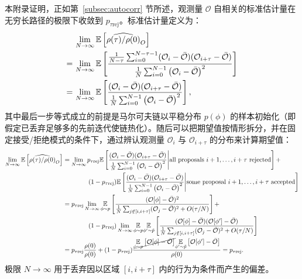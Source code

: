 本附录证明，正如第~\ref{subsec:autocorr} 节所述，观测量 $\mathcal{O}$ 自相关的标准估计量在无穷长路径的极限下收敛到 $p_{\tau \mathrm{rej}}$。标准估计量定义为：
%
\begin{align}
& \lim_{N\rightarrow\infty} \underset{}{\mathbb{E}}\left[ \widehat{\rho(\tau)/\rho(0)}_O \right] \\
=\,&
    \lim_{N\rightarrow\infty} \underset{}{\mathbb{E}} \left[ \frac{\frac{1}{N-\tau} \sum_{i=0}^{N-\tau-1} (\mathcal{O}_i - \bar{\mathcal{O}})(\mathcal{O}_{i+\tau}-\bar{\mathcal{O}})}{\frac{1}{N} \sum_{i=0}^{N-1} \left(\mathcal{O}_i - \bar{\mathcal{O}}\right)^2} \right] \\
=\,& \lim_{N\rightarrow\infty} \underset{}{\mathbb{E}} \left[ \frac{(\mathcal{O}_i - \bar{\mathcal{O}})(\mathcal{O}_{i+\tau}-\bar{\mathcal{O}})}{\frac{1}{N} \sum_{i=0}^{N-1} \left(\mathcal{O}_i - \bar{\mathcal{O}}\right)^2} \right],
\end{align}
%
其中最后一步等式成立的前提是马尔可夫链以平稳分布 $p(\phi)$ 的样本初始化（即假定已丢弃足够多的先前迭代使链热化）。随后可以把期望值按情形拆分，并在固定接受/拒绝模式的条件下，通过辨认观测量 $\mathcal{O}_i$ 与 $\mathcal{O}_{i+\tau}$ 的分布来计算期望值：
%
\begin{align}
\lim_{N\rightarrow\infty} \underset{}{\mathbb{E}}\left[ \widehat{\rho(\tau)/\rho(0)}_O \right]
&= \lim_{N\rightarrow \infty} p_{\tau\text{rej}} \underset{}{\mathbb{E}} \left[ \frac{(\mathcal{O}_i - \bar{\mathcal{O}})(\mathcal{O}_{i+\tau}-\bar{\mathcal{O}})}{\frac{1}{N} \sum_{i=0}^{N-1} \left(\mathcal{O}_i - \bar{\mathcal{O}}\right)^2}
    \Bigg| \text{all proposals } i+1, \dots, i+\tau \text{ rejected} \right] + \nonumber\\
    &\qquad\qquad (1-p_{\tau\text{rej}}) \underset{}{\mathbb{E}} \left[ \frac{(\mathcal{O}_i - \bar{\mathcal{O}})(\mathcal{O}_{i+\tau}-\bar{\mathcal{O}})}{\frac{1}{N} \sum_{i=0}^{N-1} \left(\mathcal{O}_i - \bar{\mathcal{O}}\right)^2}
    \Bigg| \text{some proposal } i+1, \dots, i+\tau \text{ accepted} \right] \\
&= p_{\tau\text{rej}} \lim_{N\rightarrow\infty} \underset{\phi\sim p}{\mathbb{E}} \left[ \frac{(\mathcal{O}[\phi] - \bar{\mathcal{O}})^2}{\frac{1}{N} \sum_{j \notin [i,i+\tau]} (\mathcal{O}_j - \bar{\mathcal{O}})^2 + O(\tau/N)} \right] + \nonumber\\
    &\qquad\qquad (1-p_{\tau\text{rej}}) \lim_{N\rightarrow\infty} \underset{\phi\sim p}{\mathbb{E}} \underset{\phi' \sim \tilde{p}}{\mathbb{E}} \left[  \frac{(\mathcal{O}[\phi] - \bar{\mathcal{O}})(\mathcal{O}[\phi'] - \bar{\mathcal{O}})}{\frac{1}{N} \sum_{j \notin [i,i+\tau]} (\mathcal{O}_j - \bar{\mathcal{O}})^2 + O(\tau/N)} \right] \\
&= p_{\tau\text{rej}} \frac{\rho(0)}{\rho(0)} + (1-p_{\tau\text{rej}}) \frac{\cancel{\underset{\phi\sim p}{\mathbb{E}} \left[ \mathcal{O}[\phi] - \bar{\mathcal{O}} \right]} \underset{\phi'\sim \tilde{p}}{\mathbb{E}} \left[ \mathcal{O}[\phi'] - \bar{\mathcal{O}} \right]}{\rho(0)} = p_{\tau\text{rej}}.
\end{align}
%
极限 $N \rightarrow \infty$ 用于丢弃因以区域 $[i,i+\tau]$ 内的行为为条件而产生的偏差。


